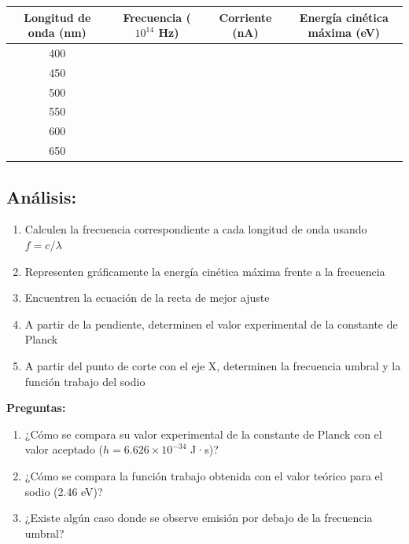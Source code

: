 \documentclass[12pt,a4paper]{article}
\begin{document}
	\begin{center}
		\begin{tabular}{|c|c|c|c|}
			\hline
			\textbf{Longitud de onda (nm)} & \textbf{Frecuencia ($10^{14}$ Hz)} & \textbf{Corriente (nA)} & \textbf{Energía cinética máxima (eV)} \\
			\hline
			400 & & & \\
			\hline
			450 & & & \\
			\hline
			500 & & & \\
			\hline
			550 & & & \\
			\hline
			600 & & & \\
			\hline
			650 & & & \\
			\hline
		\end{tabular}
	\end{center}
	
	\subsection{Análisis:}
	\begin{enumerate}
		\item Calculen la frecuencia correspondiente a cada longitud de onda usando $f = c/\lambda$
		\item Representen gráficamente la energía cinética máxima frente a la frecuencia
		\item Encuentren la ecuación de la recta de mejor ajuste
		\item A partir de la pendiente, determinen el valor experimental de la constante de Planck
		\item A partir del punto de corte con el eje X, determinen la frecuencia umbral y la función trabajo del sodio
	\end{enumerate}
	
	\begin{preguntabox}
		\textbf{Preguntas:}
		\begin{enumerate}
			\item ¿Cómo se compara su valor experimental de la constante de Planck con el valor aceptado ($h = 6.626 \times 10^{-34}$ J·s)?
			\item ¿Cómo se compara la función trabajo obtenida con el valor teórico para el sodio (2.46 eV)?
			\item ¿Existe algún caso donde se observe emisión por debajo de la frecuencia umbral?
		\end{enumerate}
	\end{preguntabox}
	
	\newpage
	
\end{document}
